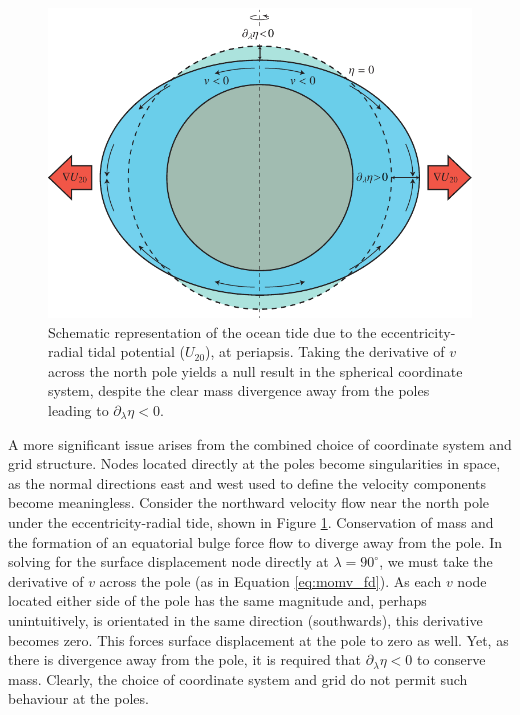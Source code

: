\begin{figure}[!b]
\includegraphics[width=\linewidth]{Figures/CoordProb}
\caption{Schematic representation of the ocean tide due to the eccentricity-radial tidal potential ($U_{20}$), at periapsis. Taking the derivative of $v$ across the north pole yields a null result in the spherical coordinate system, despite the clear mass divergence away from the poles leading to $\partial_{\lambda} \eta < 0$.\label{fig:coord_prob}}
\end{figure}

A more significant issue arises from the combined choice of coordinate system and grid structure. Nodes located directly at the poles become singularities in space, as the normal directions east and west used to define the velocity components become meaningless. Consider the northward velocity flow near the north pole under the eccentricity-radial tide, shown in Figure \ref{fig:coord_prob}. Conservation of mass and the formation of an equatorial bulge force flow to diverge away from the pole. In solving for the surface displacement node directly at $\lambda = 90^{\circ}$, we must take the derivative of $v$ across the pole (as in Equation \ref{eq:momv_fd}). As each $v$ node located either side of the pole has the same magnitude and, perhaps unintuitively, is orientated in the same direction (southwards), this derivative becomes zero.  This forces surface displacement at the pole to zero as well. Yet, as there is divergence away from the pole, it is required that $\partial_{\lambda} \eta < 0$ to conserve mass. Clearly, the choice of coordinate system and grid do not permit such behaviour at the poles. %

